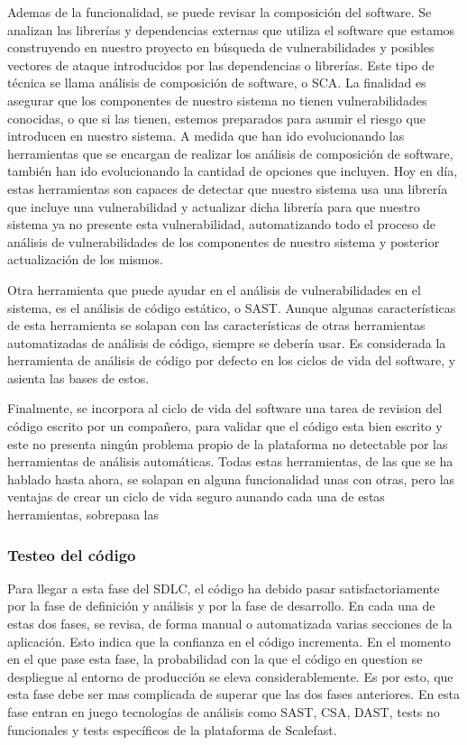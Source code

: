 \documentclass[12pt]{report} %
\begin{document}
Ademas de la funcionalidad, se puede revisar la composición del software.  Se
analizan las librerías y dependencias externas que utiliza el software que
estamos construyendo en nuestro proyecto en búsqueda de vulnerabilidades y
posibles vectores de ataque introducidos por las dependencias o librerías.  Este
tipo de técnica se llama análisis de composición de software, o \gls{SCA}.  La
finalidad es asegurar que los componentes de nuestro sistema no tienen
vulnerabilidades conocidas, o que si las tienen, estemos preparados para asumir
el riesgo que introducen en nuestro sistema.  A medida que han ido evolucionando
las herramientas que se encargan de realizar los análisis de composición de
software, también han ido evolucionando la cantidad de opciones que incluyen.
Hoy en día, estas herramientas son capaces de detectar que nuestro sistema usa
una librería que incluye una vulnerabilidad y actualizar dicha librería para que
nuestro sistema ya no presente esta vulnerabilidad, automatizando todo el
proceso de análisis de vulnerabilidades de los componentes de nuestro sistema y
posterior actualización de los mismos.

Otra herramienta que puede ayudar en el análisis de vulnerabilidades en el
sistema, es el análisis de código estático, o \gls{SAST}.  Aunque algunas
características de esta herramienta se solapan con las características de otras
herramientas automatizadas de análisis de código, siempre se debería usar.  Es
considerada la herramienta de análisis de código por defecto en los ciclos de
vida del software, y asienta las bases de estos.

Finalmente, se incorpora al ciclo de vida del software una tarea de revision del
código escrito por un compañero, para validar que el código esta bien escrito y
este no presenta ningún problema propio de la plataforma no detectable por las
herramientas de análisis automáticas. Todas estas herramientas, de las que se ha
hablado hasta ahora, se solapan en alguna funcionalidad unas con otras, pero las
ventajas de crear un ciclo de vida seguro aunando cada una de estas
herramientas, sobrepasa las 


\subsubsection{Testeo del código} \label{testeodecodigo}

Para llegar a esta fase del \gls{SDLC}, el código ha debido pasar
satisfactoriamente por la fase de definición y análisis y por la fase de
desarrollo.  En cada una de estas dos fases, se revisa, de forma manual o
automatizada varias secciones de la aplicación.  Esto indica que la confianza en
el código incrementa.  En el momento en el que pase esta fase, la probabilidad
con la que el código en question se despliegue al entorno de producción se eleva
considerablemente.  Es por esto, que esta fase debe ser mas complicada de
superar que las dos fases anteriores.  En esta fase entran en juego tecnologías
de análisis como \gls{SAST}, \gls{CSA}, \gls{DAST}, tests no funcionales y tests
específicos de la plataforma de Scalefast.
\end{document}
